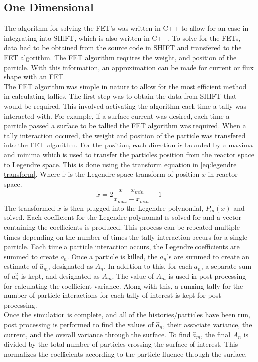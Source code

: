 \documentclass[10tma4paper]{article}
\begin{document}
\subsection{One Dimensional}\label{alg oned}
The algorithm for solving the FET's was written in C++ to allow for an ease in integrating into SHIFT, which is also written in C++. To solve for the FETs, data had to be obtained from the source code in SHIFT and transfered to the FET algorithm. The FET algorithm requires the weight, and position of the particle. With this information, an approximation can be made for current or flux shape with an FET.
\\
The FET algorithm was simple in nature to allow for the most efficient method in calculating tallies. The first step was to obtain the data from SHIFT that would be required. This involved activating the algorithm each time a tally was interacted with. For example, if a surface current was desired, each time a particle passed a surface to be tallied the FET algorithm was required. When a tally interaction occured, the weight and position of the particle was transfered into the FET algorithm. For the position, each direction is bounded by a maxima and minima which is used to transfer the particles position from the reactor space to Legendre space. This is done using the transform equation in \eqref{eq:legendre transform}. Where $\tilde{x}$ is the Legendre space transform of position $x$ in reactor space.
\begin{equation} \label{eq:legendre transform}
\tilde{x} = 2 \frac{x-x_{min}}{x_{max}-x_{min}} - 1
\end{equation}
The transformed $\tilde{x}$ is then plugged into the Legendre polynomial, $P_{m}(x)$ and solved. Each coefficient for the Legendre polynomial is solved for and a vector containing the coefficients is produced. This process can be repeated multiple times depending on the number of times the tally interaction occurs for a single particle. Each time a particle interaction occurs, the Legendre coefficients are summed to create $a_{n}$. Once a particle is killed, the $a_{n}$'s are summed to create an estimate of $\hat{a}_{m}$, designated as $A_{n}$. In addition to this, for each $a_{n}$, a separate sum of $a_{n}^{2}$ is kept, and designated as $A_{m}$. The value of $A_{m}$ is used in post processing for calculating the coefficient variance. Along with this, a running tally for the number of particle interactions for each tally of interest is kept for post processing.
\\
Once the simulation is complete, and all of the histories/particles have been run, post processing  is performed to find the values of $\hat{a}_{n}$, their associate variance, the current, and the overall variance through the surface. To find $\hat{a}_{m}$, the final $A_{n}$ is divided by the total number of particles crossing the surface of interest. This normalizes the coefficients according to the particle fluence through the surface. \\
\end{document}
